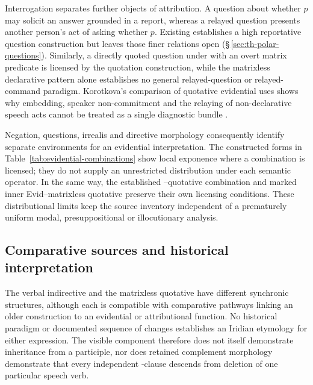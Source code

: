 Interrogation separates further objects of attribution. A question about
whether $p$ may solicit an answer grounded in a report, whereas a relayed
question presents another person's act of asking whether $p$. Existing
 establishes a high reportative question construction but
leaves those finer relations open (§\,\ref{sec:th-polar-questions}).
Similarly, a directly quoted question under  with an overt matrix
predicate is licensed by the quotation construction, while the matrixless declarative
pattern alone establishes no general relayed-question or relayed-command
paradigm. Korotkova's comparison of quotative evidential uses shows why
embedding, speaker non-commitment and the relaying of non-declarative
speech acts cannot be treated as a single diagnostic bundle
\cite[§§3--4, pp.~685--690]{korotkova2017}.

Negation, questions, irrealis and directive morphology consequently
identify separate environments for an evidential interpretation. The
constructed forms in Table~\ref{tab:evidential-combinations} show local
exponence where a combination is licensed; they do not supply an
unrestricted distribution under each semantic operator. In the same way,
the established --quotative combination and marked inner
Evid--matrixless quotative preserve their own licensing conditions.
These distributional limits keep the source inventory independent of a
prematurely uniform modal, presuppositional or illocutionary analysis.

\subsection{Comparative sources and historical interpretation}
\label{sec:evidential-historical-comparison}

The verbal indirective and the matrixless quotative have different
synchronic structures, although each is compatible with comparative
pathways linking an older construction to an evidential or attributional
function. No historical paradigm or documented sequence of changes
establishes an Iridian etymology for either expression. The visible
 component therefore does not itself demonstrate inheritance
from a participle, nor does retained complement morphology demonstrate
that every independent -clause descends from deletion of one
particular speech verb.

